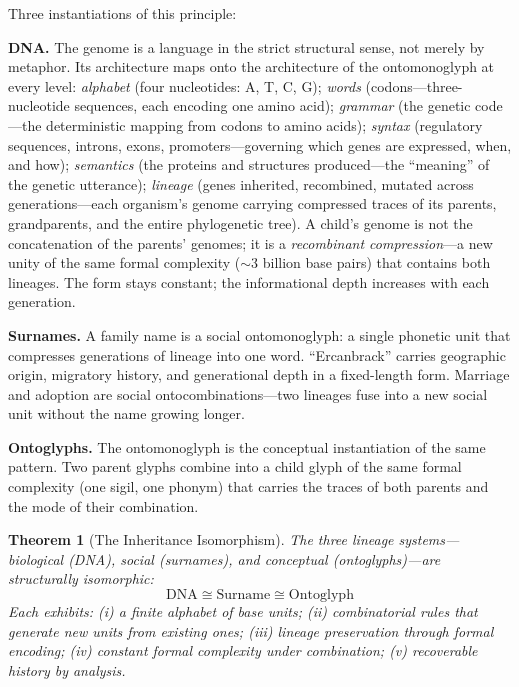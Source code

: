 \documentclass[12pt, letterpaper]{book}
\newtheorem{theorem}{Theorem}[chapter]
\begin{document}
Three instantiations of this principle:

\textbf{DNA.} The genome is a language in the strict structural sense, not merely by metaphor. Its architecture maps onto the architecture of the ontomonoglyph at every level: \textit{alphabet} (four nucleotides: A, T, C, G); \textit{words} (codons---three-nucleotide sequences, each encoding one amino acid); \textit{grammar} (the genetic code---the deterministic mapping from codons to amino acids); \textit{syntax} (regulatory sequences, introns, exons, promoters---governing which genes are expressed, when, and how); \textit{semantics} (the proteins and structures produced---the ``meaning'' of the genetic utterance); \textit{lineage} (genes inherited, recombined, mutated across generations---each organism's genome carrying compressed traces of its parents, grandparents, and the entire phylogenetic tree). A child's genome is not the concatenation of the parents' genomes; it is a \textit{recombinant compression}---a new unity of the same formal complexity ($\sim$3 billion base pairs) that contains both lineages. The form stays constant; the informational depth increases with each generation.

\textbf{Surnames.} A family name is a social ontomonoglyph: a single phonetic unit that compresses generations of lineage into one word. ``Ercanbrack'' carries geographic origin, migratory history, and generational depth in a fixed-length form. Marriage and adoption are social ontocombinations---two lineages fuse into a new social unit without the name growing longer.

\textbf{Ontoglyphs.} The ontomonoglyph is the conceptual instantiation of the same pattern. Two parent glyphs combine into a child glyph of the same formal complexity (one sigil, one phonym) that carries the traces of both parents and the mode of their combination.

\begin{theorem}[The Inheritance Isomorphism]\label{thm:inheritance}
The three lineage systems---biological (DNA), social (surnames), and conceptual (ontoglyphs)---are structurally isomorphic:
\[
\mathrm{DNA} \cong \mathrm{Surname} \cong \mathrm{Ontoglyph}
\]
Each exhibits: (i) a finite alphabet of base units; (ii) combinatorial rules that generate new units from existing ones; (iii) lineage preservation through formal encoding; (iv) constant formal complexity under combination; (v) recoverable history by analysis.
\end{theorem}
\end{document}
